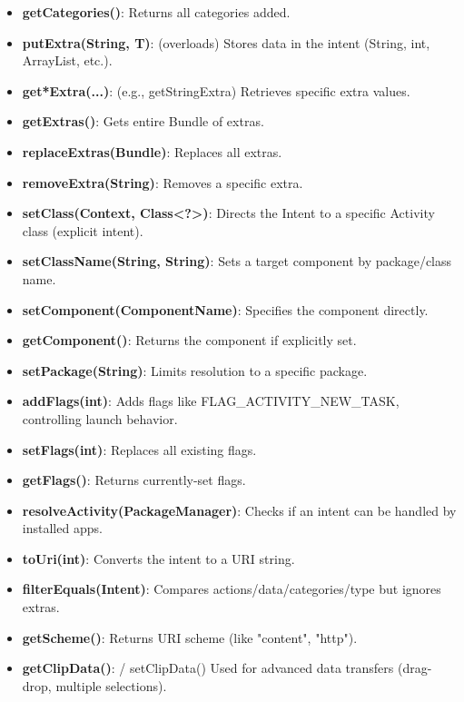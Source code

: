 \documentclass{report}
\begin{document}
\begin{itemize}
\begin{itemize}
                \item \textbf{getCategories()}:	Returns all categories added.
                \item \textbf{putExtra(String, T)}: (overloads)	Stores data in the intent (String, int, ArrayList, etc.).
                \item \textbf{get*Extra(...)}: (e.g., getStringExtra)	Retrieves specific extra values.
                \item \textbf{getExtras()}:	Gets entire Bundle of extras.
                \item \textbf{replaceExtras(Bundle)}:	Replaces all extras.
                \item \textbf{removeExtra(String)}:	Removes a specific extra.
                \item \textbf{setClass(Context, Class<?>)}:	Directs the Intent to a specific Activity class (explicit intent).
                \item \textbf{setClassName(String, String)}:	Sets a target component by package/class name.
                \item \textbf{setComponent(ComponentName)}:	Specifies the component directly.
                \item \textbf{getComponent()}:	Returns the component if explicitly set.
                \item \textbf{setPackage(String)}:	Limits resolution to a specific package.
                \item \textbf{addFlags(int)}:	Adds flags like FLAG\_ACTIVITY\_NEW\_TASK, controlling launch behavior.
                \item \textbf{setFlags(int)}:	Replaces all existing flags.
                \item \textbf{getFlags()}:	Returns currently-set flags.
                \item \textbf{resolveActivity(PackageManager)}:	Checks if an intent can be handled by installed apps.
                \item \textbf{toUri(int)}:	Converts the intent to a URI string.
                \item \textbf{filterEquals(Intent)}:	Compares actions/data/categories/type but ignores extras.
                \item \textbf{getScheme()}:	Returns URI scheme (like "content", "http").
                \item \textbf{getClipData()}: / setClipData()	Used for advanced data transfers (drag-drop, multiple selections).
            \end{itemize}

\end{itemize}
\end{document}
